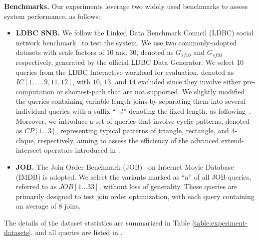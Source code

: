 \noindent\textbf{Benchmarks.} Our experiments leverage two widely used benchmarks to assess system performance, as follows:
\begin{itemize}
    \item \textbf{LDBC SNB.} We follow the Linked Data Benchmark Council (LDBC) social network benchmark~\cite{ldbc_snb} to test the system. We use two commonly-adopted datasets with scale factors of 10 and 30, denoted as $G_{sf10}$ and $G_{sf30}$ respectively, generated by the official LDBC Data Generator.
    We select 10 queries from the LDBC Interactive workload for evaluation, denoted as $IC[1, \ldots, 9, 11, 12]$, with $10$, $13$, and $14$ excluded since they involve either pre-computation or shortest-path that are not supported.
    We slightly modified the queries containing variable-length joins by separating them into several individual queries with a suffix ``$-l$'' denoting the fixed length, as following~\cite{graindb}.
    Moreover, we introduce a set of queries that involve cyclic patterns, denoted as $CP[1\ldots 3]$, representing typical patterns of triangle, rectangle, and 4-clique, respectively, aiming to assess the efficiency of the advanced extend-intersect operators introduced in \name.
    \item \textbf{JOB.} The Join Order Benchmark (JOB)~\cite{job_snb} on Internet Movie Database (IMDB) is adopted. We select the variants marked as ``a'' of all JOB queries, referred to as $JOB[1\ldots 33]$, without loss of generality. These queries are primarily designed to test join order optimization, with each query containing an average of $8$ joins.
\end{itemize}
The details of the dataset statistics are summarized in Table \ref{table:experiment-datasets}, and all queries are listed in .

